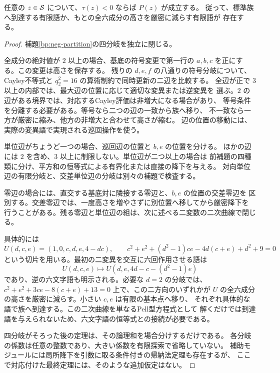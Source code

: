 \begin{theorem}[負側の無条件局所還元]
\label{bp:neg-step}
\leanok
任意の \(z\in\mathcal S\) について、\(\tau(z)<0\) ならば \(P(z)\) が成立する。
従って、標準族へ到達する有限語か、もとの全六成分の高さを厳密に減らす有限語が
存在する。
\end{theorem}
\begin{proof}
\leanok
補題\ref{bp:neg-partition}の四分岐を独立に閉じる。

全成分の絶対値が \(2\) 以上の場合、基底の符号変更で第一行の
\(a,b,c\) を正にする。この変更は高さを保存する。
残りの \(d,e,f\) の八通りの符号分岐について、Cayley不等式と
\(q_2^2=16\) の算術制約で同時更新の二辺を比較する。
全辺が正で \(3\) 以上の内部では、最大辺の位置に応じて適切な変異または逆変異を
選ぶ。\(2\) の辺がある境界では、対応するCayley評価は非増大になる場合があり、
等号条件を分離する必要がある。等号なら二つの辺の一致から族へ移り、
不一致なら一方が厳密に縮み、他方の非増大と合わせて高さが縮む。
辺の位置の移動には、実際の変異語で実現される巡回操作を使う。

単位辺がちょうど一つの場合、巡回辺の位置と \(b,e\) の位置を分ける。
ほかの辺には \(2\) を含め、\(3\) 以上に制限しない。単位辺が二つ以上の場合は
前補題の四種類に分け、平方和の恒等式による有界化または直接の降下を与える。
対向単位辺の有限分岐と、交差単位辺の分岐は別々の補題で検査する。

零辺の場合には、直交する基底対に隣接する零辺と、\(b,e\) の位置の交差零辺を
区別する。交差零辺では、一度高さを増やさずに別位置へ移してから厳密降下を
行うことがある。残る零辺と単位辺の組は、次に述べる二変数の二次曲線で閉じる。

具体的には
\[
 U(d,c,e)=(1,0,c,d,e,4-dc),\qquad
 c^2+e^2+(d^2-1)ce-4d(c+e)+d^2+9=0
\]
という切片を用いる。最初の二変異を交互に六回作用させる語は
\[
 U(d,c,e)\longmapsto U(d,e,4d-c-(d^2-1)e)
\]
であり、逆の六文字語も明示される。必要な \(d=2\) の分岐では、
\(c^2+e^2+3ce-8(c+e)+13=0\) 上で、この二方向のいずれかが
\(U\) の全六成分の高さを厳密に減らす。小さい \(c,e\) は有限の基本点へ移り、
それぞれ具体的な語で族へ到達する。この二次曲線を単なるPell型方程式として
解くだけでは到達語を与えられないため、六文字語の恒等式との接続が必要である。

四分岐がそろった後の定理は、その論理和を場合分けするだけである。
各分岐の係数は任意の整数であり、大きい係数を有限探索で省略していない。
補助モジュールには局所降下を引数に取る条件付きの帰納法定理も存在するが、
ここで対応付けた最終定理には、そのような追加仮定はない。
\end{proof}

